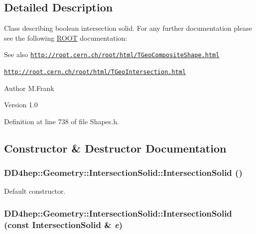 \subsection{Detailed Description}
Class describing boolean intersection solid. For any further documentation please see the following \hyperlink{namespace_r_o_o_t}{ROOT} documentation: \begin{DoxySeeAlso}{See also}
\href{http://root.cern.ch/root/html/TGeoCompositeShape.html}{\tt http://root.cern.ch/root/html/TGeoCompositeShape.html} 

\href{http://root.cern.ch/root/html/TGeoIntersection.html}{\tt http://root.cern.ch/root/html/TGeoIntersection.html}
\end{DoxySeeAlso}
\begin{DoxyAuthor}{Author}
M.Frank 
\end{DoxyAuthor}
\begin{DoxyVersion}{Version}
1.0 
\end{DoxyVersion}


Definition at line 738 of file Shapes.h.

\subsection{Constructor \& Destructor Documentation}
\hypertarget{class_d_d4hep_1_1_geometry_1_1_intersection_solid_aa7d337896a7774ccba7dc4535fb5d561}{
\subsubsection[{IntersectionSolid}]{\setlength{\rightskip}{0pt plus 5cm}DD4hep::Geometry::IntersectionSolid::IntersectionSolid ()}}
\label{class_d_d4hep_1_1_geometry_1_1_intersection_solid_aa7d337896a7774ccba7dc4535fb5d561}


Default constructor. \hypertarget{class_d_d4hep_1_1_geometry_1_1_intersection_solid_a31e5900024ffde253c9d88942db0a96c}{
\subsubsection[{IntersectionSolid}]{\setlength{\rightskip}{0pt plus 5cm}DD4hep::Geometry::IntersectionSolid::IntersectionSolid (const {\bf IntersectionSolid} \& {\em e})}}
\label{class_d_d4hep_1_1_geometry_1_1_intersection_solid_a31e5900024ffde253c9d88942db0a96c}


